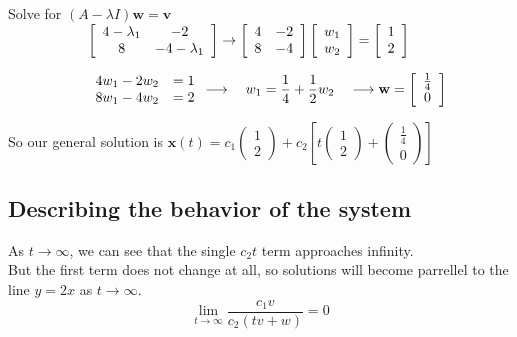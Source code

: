 \documentclass[12pt]{article}
\begin{document}
\begin{enumerate}
    \hspace*{2cm}Solve for $ (A - \lambda I)\mathbf{w} = \mathbf{v}$ \\ 
    $\hspace*{2cm}\left[\begin{array}{cc} 4 - \lambda_1 & -2\\ 8 & -4 - \lambda_1\end{array}\right]
    \rightarrow \left[\begin{array}{rr} 4& -2\\ 8 & -4 \end{array}\right] \left[\begin{array}{cc} w_1 \\ w_2 \end{array}\right] = \left[\begin{array}{cc} 1 \\ 2 \end{array}\right]$

    $\hspace*{2cm}\begin{array}{rr} 4w_1 - 2w_2 &=1 \\ 8w_1 - 4w_2 &=2 \end{array} 
    \longrightarrow \quad w_1=\dfrac{1}{4} + \dfrac{1}{2}w_2 \quad \longrightarrow \mathbf{w} =\left[\begin{array}{cc} \frac{1}{4} \\ 0 \end{array}\right]$

    So our general solution is $\mathbf{x}(t) = c_1\begin{pmatrix} 1 \\ 2 \end{pmatrix}+ c_2\left[ t \begin{pmatrix} 1 \\ 2 \end{pmatrix} + \begin{pmatrix} \frac{1}{4} \\ 0 \end{pmatrix}\right]$
    
    \vspace{10cm}
    \subsection*{Describing the behavior of the system}
    As $t \to \infty$, we can see that the single $c_2t$ term approaches infinity. \\
    But the first term does not change at all, so solutions will become parrellel to the line $y=2x$ as $t \to \infty$.
    $$\lim_{t \to \infty} \frac{c_1v}{c_2(tv + w)}  =  0$$

\end{enumerate}
\end{document}
